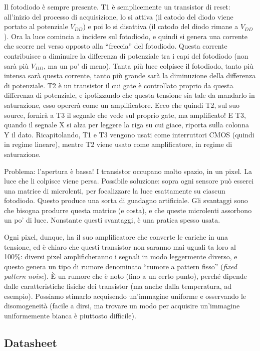 \documentclass[a4paper,11pt]{article}
\begin{document}
Il fotodiodo è sempre presente. T1 è semplicemente un transistor di reset: all'inizio del processo di acquisizione, lo si attiva (il catodo del diodo viene portato
al potenziale $V_{DD}$) e poi lo si disattiva (il catodo del diodo rimane a $V_{DD}$). Ora la luce comincia a incidere sul fotodiodo, e quindi si genera una corrente che scorre
nel verso opposto alla ``freccia'' del fotodiodo. Questa corrente contribuisce a diminuire la differenza di potenziale tra i capi del fotodiodo (non sarà più $V_{DD}$,
ma un po' di meno). Tanta più luce colpisce il fotodiodo, tanto più intensa sarà questa corrente, tanto più grande sarà la diminuzione della differenza di potenziale.
T2 è un transistor il cui gate è controllato proprio da questa differenza di potenziale, e ipotizzando che questa tensione sia tale da mandarlo in saturazione, esso
opererà come un amplificatore. Ecco che quindi T2, sul suo source, fornirà a T3 il segnale
che vede sul proprio gate, ma amplificato! E T3, quando il segnale X si alza per leggere la riga su cui giace, riporta sulla colonna Y il dato.
Ricapitolando, T1 e T3 vengono usati come interruttori CMOS (quindi in regime lineare), mentre T2 viene usato come amplificatore, in regime di saturazione.

\par
Problema: l'apertura è bassa! I transistor occupano molto spazio, in un pixel. La luce che li colpisce viene persa.
Possibile soluzione: sopra ogni sensore può esserci una matrice di microlenti, per focalizzare la luce esattamente su ciascun fotodiodo.
Questo produce una sorta di guadagno artificiale.
Gli svantaggi sono che bisogna produrre questa matrice (e costa), e che queste microlenti assorbono un po' di luce. Nonstante questi svantaggi, è una pratica spesso usata.
\par
Ogni pixel, dunque, ha il suo amplificatore che converte le cariche in una tensione, ed è chiaro che questi
transistor non saranno mai uguali ta loro al 100\%: diversi pixel amplificheranno i segnali in modo leggermente diverso,
e questo genera un tipo di rumore denominato ``rumore a pattern fisso'' (\textit{fixed pattern noise}).
È un rumore che è noto (fino a un certo punto), perché dipende dalle caratteristiche fisiche dei transistor (ma anche dalla temperatura, ad esempio).
Possiamo stimarlo acquisendo un'immagine uniforme e osservando le disomogeneità (facile a dirsi, ma trovare un modo per acquisire un'immagine uniformemente bianca
è piuttosto difficile).

\subsection{Datasheet}
\end{document}
